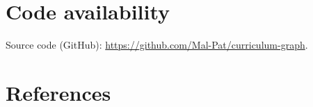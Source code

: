\section{Code availability}
Source code (GitHub): \url{https://github.com/Mal-Pat/curriculum-graph}.

\section{References}




